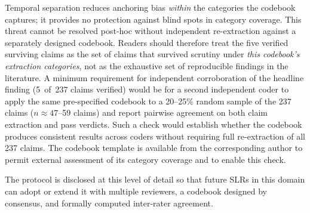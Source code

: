 Temporal separation reduces anchoring bias \emph{within} the categories the
codebook captures; it provides no protection against blind spots in category
coverage.
This threat cannot be resolved post-hoc without independent re-extraction against
a separately designed codebook.
Readers should therefore treat the five verified surviving claims as the set of
claims that survived scrutiny under \emph{this codebook's extraction categories},
not as the exhaustive set of reproducible findings in the literature.
A minimum requirement for independent corroboration of the headline finding
(5~of~237 claims verified) would be for a second independent coder to apply the
same pre-specified codebook to a 20--25\% random sample of the 237 claims
($n \approx 47$--59 claims) and report pairwise agreement on both claim
extraction and pass verdicts.
Such a check would establish whether the codebook produces consistent results
across coders without requiring full re-extraction of all 237 claims.
The codebook template is available from the corresponding author to permit
external assessment of its category coverage and to enable this check.

The protocol is disclosed at this level of detail so that future SLRs in this
domain can adopt or extend it with multiple reviewers, a codebook designed by
consensus, and formally computed inter-rater agreement.
